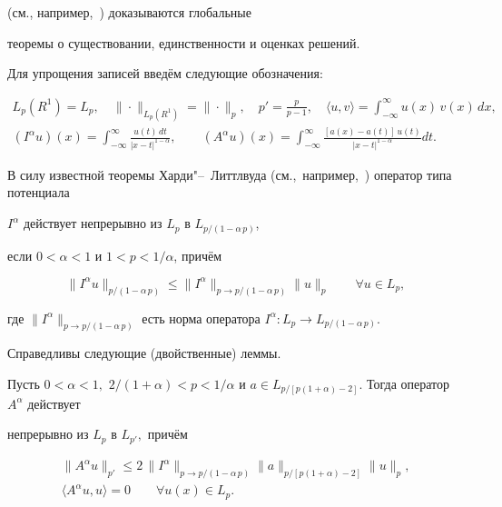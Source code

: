 (см., например,~\cite{askhabov:ASK}) доказываются глобальные

теоремы о существовании, единственности и оценках решений.



Для упрощения записей введём следующие обозначения:

\begin{gather*}

L_p(R^1)=L_p, \quad \|\cdot \|_{L_p(R^1)}=\|\cdot \|_p, \quad

p'=\frac{p}{p-1}, \quad \langle u,

v\rangle=\int _{-\infty}^{\infty}u(x)\,v(x)\,dx,\\

(I^{\alpha}u

)(x)=\int _{-\infty}^{\infty}\frac{u(t)\,dt}{|x-t|^{1-\alpha}},

\qquad

(A^{\alpha}u)(x)=\int _{-\infty}^{\infty}\frac{[a(x)-a(t)]\,u(t)}{|x-t|^{1-\alpha}}dt.

\end{gather*}



В силу известной теоремы Харди"--~Литтлвуда (см.,~например,~\cite{askhabov:ASK}) оператор типа потенциала

$I^\alpha$ действует непрерывно из $L_p$ в $L_{p/(1-\alpha\,p)}$,

если $0<\alpha<1$ и $1<p<1/\alpha$, причём

\begin{equation}

\label{hardi1} \|I^\alpha u\|_{p/(1-\alpha\,p)}\leq

\|I^\alpha\|_{p\to p/(1-\alpha\,p)}\|u\|_p \qquad \forall u\in

L_p,

\end{equation}

где $\|I^\alpha\|_{p\to p/(1-\alpha\,p)}$ есть норма оператора $I^\alpha : L_p\to L_{p/(1-\alpha\,p)}$.



Справедливы следующие (двойственные) леммы.



\begin{lemma}[1]Пусть $0<\alpha<1,$ $2/(1+\alpha)<p<1/\alpha$ и $a\in

L_{p/[p(1+\alpha)-2]}.$ Тогда оператор $A^{\alpha}$ действует

непрерывно из $L_p$ в $L_{p'},$ причём

\begin{gather}

\label{askh1} \|A^{\alpha}u\|_{p'}\leq  2\,\|I^\alpha\|_{p\to

p/(1-\alpha\,p)}\|a\|_{p/[p(1+\alpha)-2]}\|u\|_p ,\\

\label{posit1} \langle A^\alpha u, u\rangle = 0 \qquad \forall

u(x)\in L_p.

\end{gather}

\end{lemma}



